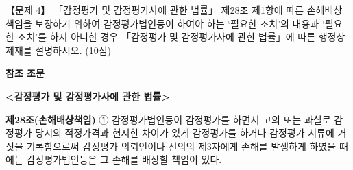 \begin{longquestion}{【문제 4】}
「감정평가 및 감정평가사에 관한 법률」 제28조 제1항에 따른 손해배상책임을 보장하기 위하여 감정평가법인등이 하여야 하는 ‘필요한 조치’의 내용과 ‘필요한 조치’를 하지 아니한 경우 「감정평가 및 감정평가사에 관한 법률」에 따른 행정상 제재를 설명하시오. (10점) \par
\medskip
\begin{framedtext}
\textbf{참조 조문} \par
\textbf{<감정평가 및 감정평가사에 관한 법률>} \par
\textbf{제28조(손해배상책임)} ① 감정평가법인등이 감정평가를 하면서 고의 또는 과실로 감정평가 당시의 적정가격과 현저한 차이가 있게 감정평가를 하거나 감정평가 서류에 거짓을 기록함으로써 감정평가 의뢰인이나 선의의 제3자에게 손해를 발생하게 하였을 때에는 감정평가법인등은 그 손해를 배상할 책임이 있다. \par
\end{framedtext}
\end{longquestion}
